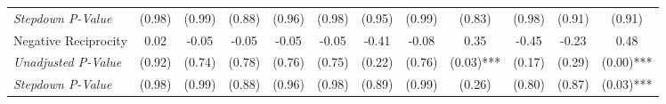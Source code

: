 \begin{tabular}{l c c c c c c c c c c c}
\quad \textit{Stepdown P-Value} & (0.98) & (0.99) & (0.88) & (0.96) & (0.98) & (0.95) & (0.99) & (0.83) & (0.98) & (0.91) & (0.91) \\
Negative Reciprocity & 0.02 & -0.05 & -0.05 & -0.05 & -0.05 & -0.41 & -0.08 & 0.35 & -0.45 & -0.23 & 0.48 \\
\quad \textit{Unadjusted P-Value} & (0.92) & (0.74) & (0.78) & (0.76) & (0.75) & (0.22) & (0.76) & (0.03)*** & (0.17) & (0.29) & (0.00)*** \\
\quad \textit{Stepdown P-Value} & (0.98) & (0.99) & (0.88) & (0.96) & (0.98) & (0.89) & (0.99) & (0.26) & (0.80) & (0.87) & (0.03)*** \\
\bottomrule
\end{tabular}
